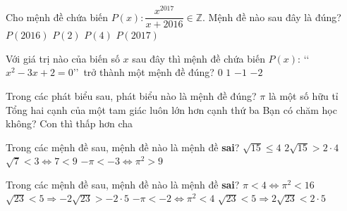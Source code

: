 \begin{ex}%
	Cho mệnh đề  chứa biến $P(x)\colon \dfrac{x^{2017}}{x+2016}\in\mathbb{Z}$. Mệnh đề nào sau đây là đúng?
	 \choice
		{\True  $P(2016)$}
		 {$P(2)$}
		{$P(4)$} 
		 {$P(2017)$}
\end{ex}

\begin{ex}%
	Với giá trị nào của biến số $x$ sau đây thì mệnh đề chứa biến $P(x)$: \lq\lq $x^2-3x+2=0$\rq\rq\ trở thành một  mệnh đề đúng?
	\choice 
		{$0 $} 
		{\True $1 $} 
		{$-1  $}
		{$-2  $}
\end{ex}

\begin{ex}%
	Trong các phát biểu sau, phát biểu nào là mệnh  đề đúng?
	\choice 
		{ $\pi $ là một số hữu  tỉ}
		{ \True Tổng hai cạnh của một tam giác luôn lớn hơn cạnh thứ  ba}
		{ Bạn có chăm học  không?}
		{ Con  thì thấp hơn cha}
\end{ex}

\begin{ex}%
	 Trong các mệnh đề sau, mệnh đề nào là mệnh đề {\bf sai}?
	\choice 
		{$\sqrt{15} \le 4$} 
		 {\True $2\sqrt{15}>2\cdot 4$}
		{$\sqrt{7}<3 \Leftrightarrow  7<9$}
		{$-\pi <-3  \Leftrightarrow \pi^2>9$}
\end{ex}

\begin{ex}%
	 Trong các mệnh đề sau, mệnh đề nào là mệnh đề \textbf{sai}?
	 \choice
		{$\pi <4 \Leftrightarrow \pi^2<16$} 
		{$\sqrt{23}<5 \Rightarrow -2\sqrt{23}>-2  \cdot 5$}
		 {\True $-\pi <-2 \Leftrightarrow \pi^2<4$}
		 {$\sqrt{23}<5 \Rightarrow 2\sqrt{23}<2 \cdot 5$}
\end{ex}

